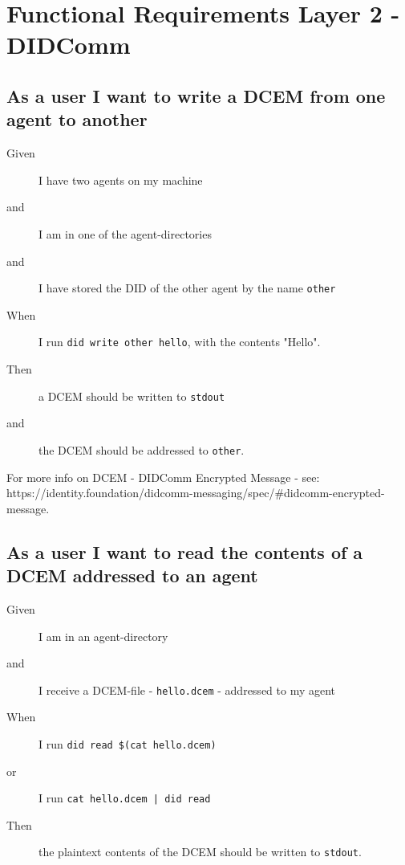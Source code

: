 \section{Functional Requirements Layer 2 - DIDComm}

\subsection{As a user I want to write a DCEM from one agent to another}
\begin{description}\begin{description}
    \item[Given] I have two agents on my machine
    \item[and] I am in one of the agent-directories
    \item[and] I have stored the DID of the other agent by the name \texttt{other}
    \item[When] I run \texttt{did write other hello}, with the contents "Hello".
    \item[Then] a DCEM should be written to \texttt{stdout}
    \item[and] the DCEM should be addressed to \texttt{other}. 
\end{description}\end{description}

For more info on DCEM - DIDComm Encrypted Message - see: https://identity.foundation/didcomm-messaging/spec/#didcomm-encrypted-message.



\subsection{As a user I want to read the contents of a DCEM addressed to an agent}
\begin{description}\begin{description}
    \item[Given] I am in an agent-directory
    \item[and] I receive a DCEM-file - \texttt{hello.dcem} - addressed to my agent
    \item[When] I run \texttt{did read \$(cat hello.dcem)} 
    \item[or] I run \texttt{cat hello.dcem | did read}
    \item[Then] the plaintext contents of the DCEM should be written to \texttt{stdout}.
\end{description}\end{description}



